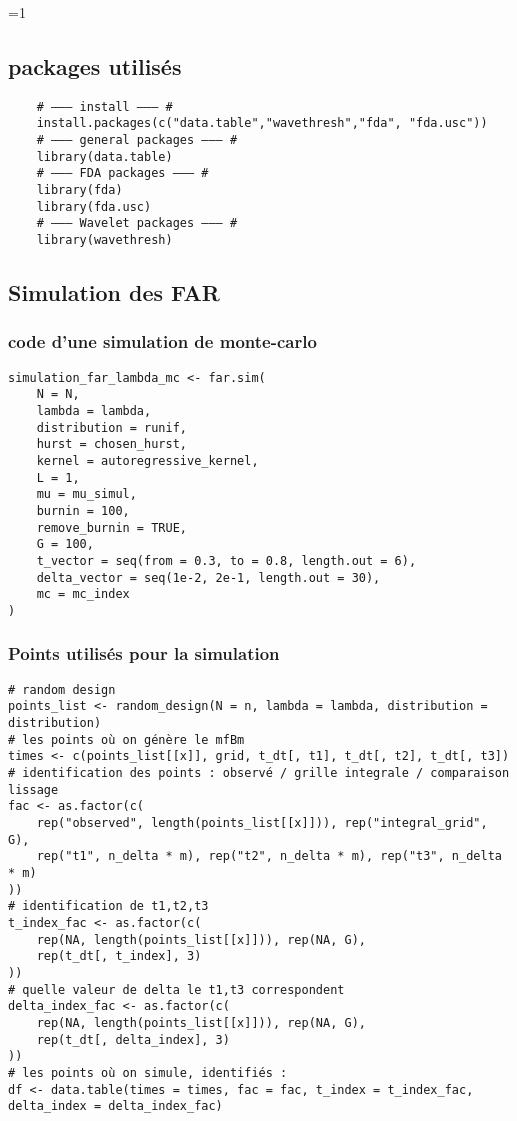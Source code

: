 \ifnum\value{code}=1
	\subsection{packages utilisés}
	\begin{verbatim}
    # ——— install ——— #
    install.packages(c("data.table","wavethresh","fda", "fda.usc"))
    # ——— general packages ——— #
    library(data.table)
    # ——— FDA packages ——— #
    library(fda)
    library(fda.usc)
    # ——— Wavelet packages ——— #
    library(wavethresh)
\end{verbatim}

\subsection{Simulation des FAR}

\subsubsection{code d'une simulation de monte-carlo}

\begin{verbatim}
simulation_far_lambda_mc <- far.sim(
    N = N,
    lambda = lambda,
    distribution = runif, 
    hurst = chosen_hurst, 
    kernel = autoregressive_kernel,
    L = 1,
    mu = mu_simul,
    burnin = 100,
    remove_burnin = TRUE,
    G = 100,
    t_vector = seq(from = 0.3, to = 0.8, length.out = 6),
    delta_vector = seq(1e-2, 2e-1, length.out = 30),
    mc = mc_index
)
\end{verbatim}

\subsubsection{Points utilisés pour la simulation}

\begin{verbatim}
# random design
points_list <- random_design(N = n, lambda = lambda, distribution = distribution)
# les points où on génère le mfBm
times <- c(points_list[[x]], grid, t_dt[, t1], t_dt[, t2], t_dt[, t3])
# identification des points : observé / grille integrale / comparaison lissage
fac <- as.factor(c(
    rep("observed", length(points_list[[x]])), rep("integral_grid", G),
    rep("t1", n_delta * m), rep("t2", n_delta * m), rep("t3", n_delta * m)
))
# identification de t1,t2,t3
t_index_fac <- as.factor(c(
    rep(NA, length(points_list[[x]])), rep(NA, G),
    rep(t_dt[, t_index], 3)
))
# quelle valeur de delta le t1,t3 correspondent
delta_index_fac <- as.factor(c(
    rep(NA, length(points_list[[x]])), rep(NA, G),
    rep(t_dt[, delta_index], 3)
))
# les points où on simule, identifiés :
df <- data.table(times = times, fac = fac, t_index = t_index_fac, delta_index = delta_index_fac)
\end{verbatim}

